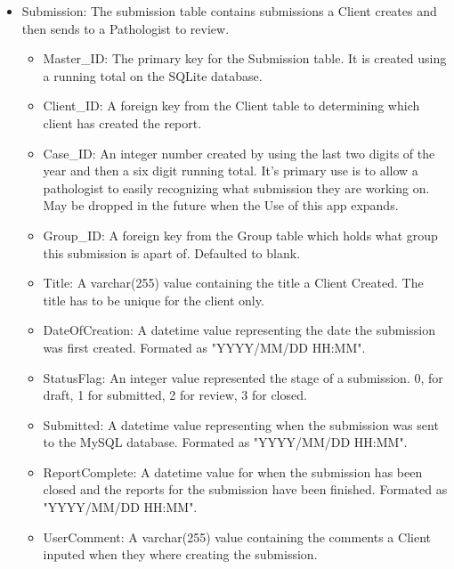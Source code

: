 \documentclass[onecolumn, draftclsnofoot, article, 10pt, compsoc]{IEEEtran}
\begin{document}
\begin{itemize}
\item Submission:\newline
The submission table contains submissions a Client creates and then sends to a Pathologist to review.
\begin{itemize}
\item Master\_ID: The primary key for the Submission table. It is created using a running total on the SQLite database.
\item Client\_ID: A foreign key from the Client table to determining which client has created the report.
\item Case\_ID: An integer number created by using the last two digits of the year and then a six digit running total. It's primary use is to allow a pathologist to easily recognizing what submission they are working on. May be dropped in the future when the Use of this app expands. 
\item Group\_ID: A foreign key from the Group table which holds what group this submission is apart of. Defaulted to blank.
\item Title: A varchar(255) value containing the title a Client Created. The title has to be unique for the client only.
\item DateOfCreation: A datetime value representing the date the submission was first created. Formated as "YYYY/MM/DD HH:MM".
\item StatusFlag: An integer value represented the stage of a submission. 0, for draft, 1 for submitted, 2 for review, 3 for closed.
\item Submitted: A datetime value representing when the submission was sent to the MySQL database. Formated as "YYYY/MM/DD HH:MM".
\item ReportComplete: A datetime value for when the submission has been closed and the reports for the submission have been finished. Formated as "YYYY/MM/DD HH:MM".
\item UserComment: A varchar(255) value containing the comments a Client inputed when they where creating the submission.
\end{itemize}


\end{itemize}
\end{document}
